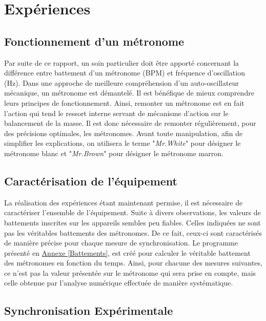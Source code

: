 \documentclass[a4paper,11pt]{report}
\begin{document}
\chapter{Expériences}
\section{Fonctionnement d'un métronome}
Par suite de ce rapport, un soin particulier doit être apporté concernant la différence entre battement d'un métronome (BPM) et fréquence d'oscillation (Hz). Dans une approche de meilleure compréhension d'un auto-oscillateur mécanique, un métronome est démantelé. Il est bénéfique de mieux comprendre leurs principes de fonctionnement. Ainsi, remonter un métronome est en fait l'action qui tend le ressort interne servant de mécanisme d'action sur le balancement de la masse. Il est donc nécessaire de remonter régulièrement, pour des précisions optimales, les métronomes. Avant toute manipulation, afin de simplifier les explications, on utilisera le terme "{\it Mr.White}" pour désigner le métronome blanc et "{\it Mr.Brown}" pour désigner le métronome marron.

\section{Caractérisation de l'équipement}
La réalisation des expériences étant maintenant permise, il est nécessaire de caractériser  l'ensemble de l'équipement. Suite à divers observations, les valeurs de battements inscrites sur les appareils sembles peu fiables. Celles indiquées ne sont pas les véritables battements des métronomes. De ce fait, ceux-ci sont caractérisés de manière précise pour chaque mesure de synchronisation. Le programme présenté en \underline{Annexe \ref{Battements}}, est créé pour calculer le véritable battement des métronomes en fonction du temps. Ainsi, pour chacune des mesures suivantes, ce n'est pas la valeur présentée sur le métronome qui sera prise en compte, mais celle obtenue par l'analyse numérique effectuée de manière systématique.

\section{Synchronisation Expérimentale}
\end{document}
